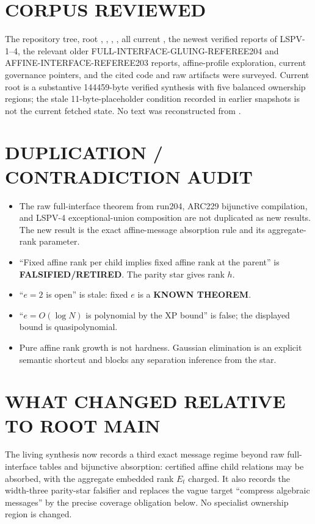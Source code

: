 \documentclass[11pt]{article}
\begin{document}
\section{CORPUS REVIEWED}
The repository tree, root , ,
, , all current
, the newest verified reports of LSPV-1--4, the relevant older
FULL-INTERFACE-GLUING-REFEREE204 and AFFINE-INTERFACE-REFEREE203 reports,
affine-profile exploration, current governance pointers, and the cited code
and raw artifacts were surveyed.  Current root is a substantive 144459-byte
verified synthesis with five balanced ownership regions; the stale
11-byte-placeholder condition recorded in earlier snapshots is not the
current fetched state.  No text was reconstructed from
.

\section{DUPLICATION / CONTRADICTION AUDIT}
\begin{itemize}
\item The raw full-interface theorem from run204, ARC229 bijunctive
compilation, and LSPV-4 exceptional-union composition are not duplicated as
new results.  The new result is the exact affine-message absorption rule and
its aggregate-rank parameter.
\item ``Fixed affine rank per child implies fixed affine rank at the parent''
is \textbf{FALSIFIED/RETIRED}.  The parity star gives rank $h$.
\item ``$e=2$ is open'' is stale: fixed $e$ is a \textbf{KNOWN THEOREM}.
\item ``$e=O(\log N)$ is polynomial by the XP bound'' is false; the displayed
bound is quasipolynomial.
\item Pure affine rank growth is not hardness.  Gaussian elimination is an
explicit semantic shortcut and blocks any separation inference from the
star.
\end{itemize}

\section{WHAT CHANGED RELATIVE TO ROOT MAIN}
The living synthesis now records a third exact message regime beyond raw
full-interface tables and bijunctive absorption: certified affine child
relations may be absorbed, with the aggregate embedded rank $E_t$ charged.
It also records the width-three parity-star falsifier and replaces the vague
target ``compress algebraic messages'' by the precise coverage obligation
below.  No specialist ownership region is changed.
\end{document}
